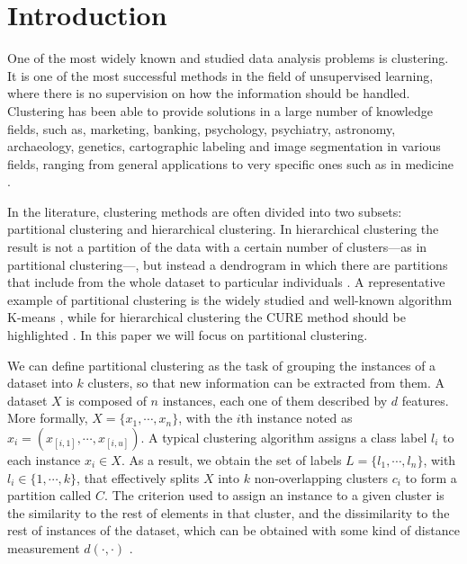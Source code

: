 \documentclass[review]{elsarticle}
\begin{document}
\linenumbers

\section{Introduction} \label{sec:Intro}

One of the most widely known and studied data analysis problems is clustering. It is one of the most successful methods in the field of unsupervised learning, where there is no supervision on how the information should be handled. Clustering has been able to provide solutions in a large number of knowledge fields, such as, marketing, banking, psychology, psychiatry, astronomy, archaeology, genetics,\cite{Everitt:2009:CA:1538772} cartographic labeling \cite{araujo2019improving} and image segmentation in various fields, ranging from general applications \cite{wang2018non} to very specific ones such as in medicine \cite{verma2016improved, aparajeeta2016modified}.

In the literature, clustering methods are often divided into two subsets: partitional clustering and hierarchical clustering. In hierarchical clustering the result is not a partition of the data with a certain number of clusters---as in partitional clustering---, but instead a dendrogram in which there are partitions that include from the whole dataset to particular individuals \cite{Everitt:2009:CA:1538772}. A representative example of partitional clustering is the widely studied and well-known algorithm K-means \cite{wu2009top}, while for hierarchical clustering the CURE method should be highlighted \cite{guha1998cure}. In this paper we will focus on partitional clustering.

We can define partitional clustering as the task of grouping the instances of a dataset into $k$ clusters, so that new information can be extracted from them. A dataset $X$ is composed of $n$ instances, each one of them described by $d$ features. More formally, $X = \{x_1, \cdots, x_n\}$, with the $i$th instance noted as $x_i = (x_{[i,1]}, \cdots, x_{[i,u]})$. A typical clustering algorithm assigns a class label $l_i$ to each instance $x_i \in X$. As a result, we obtain the set of labels $L = \{l_1, \cdots, l_n\}$, with $l_i \in \{1, \cdots, k\}$, that effectively splits $X$ into $k$ non-overlapping clusters $c_i$ to form a partition called $C$. The criterion used to assign an instance to a given cluster is the similarity to the rest of elements in that cluster, and the dissimilarity to the rest of instances of the dataset, which can be obtained with some kind of distance measurement $d(\cdot, \cdot)$ \cite{jain1999data}.
\end{document}

